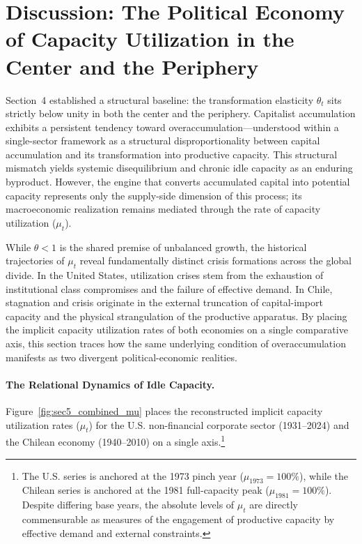 \section{Discussion: The Political Economy of Capacity Utilization in the Center and the Periphery}
\label{sec:5:comparative_historical_analysis}

Section~4 established a structural baseline: the transformation elasticity $\theta_t$ sits strictly below unity in both the center and the periphery. Capitalist accumulation exhibits a persistent tendency toward overaccumulation—understood within a single-sector framework as a structural disproportionality between capital accumulation and its transformation into productive capacity. This structural mismatch yields systemic disequilibrium and chronic idle capacity as an enduring byproduct. However, the engine that converts accumulated capital into potential capacity represents only the supply-side dimension of this process; its macroeconomic realization remains mediated through the rate of capacity utilization ($\mu_t$). 

While $\theta < 1$ is the shared premise of unbalanced growth, the historical trajectories of $\mu_t$ reveal fundamentally distinct crisis formations across the global divide. In the United States, utilization crises stem from the exhaustion of institutional class compromises and the failure of effective demand. In Chile, stagnation and crisis originate in the external truncation of capital-import capacity and the physical strangulation of the productive apparatus. By placing the implicit capacity utilization rates of both economies on a single comparative axis, this section traces how the same underlying condition of overaccumulation manifests as two divergent political-economic realities.

\paragraph{The Relational Dynamics of Idle Capacity.} 
Figure~\ref{fig:sec5_combined_mu} places the reconstructed implicit capacity utilization rates ($\mu_t$) for the U.S. non-financial corporate sector (1931--2024) and the Chilean economy (1940--2010) on a single axis.\footnote{The U.S. series is anchored at the 1973 pinch year ($\mu_{1973} = 100\%$), while the Chilean series is anchored at the 1981 full-capacity peak ($\mu_{1981} = 100\%$). Despite differing base years, the absolute levels of $\mu_t$ are directly commensurable as measures of the engagement of productive capacity by effective demand and external constraints.} 

